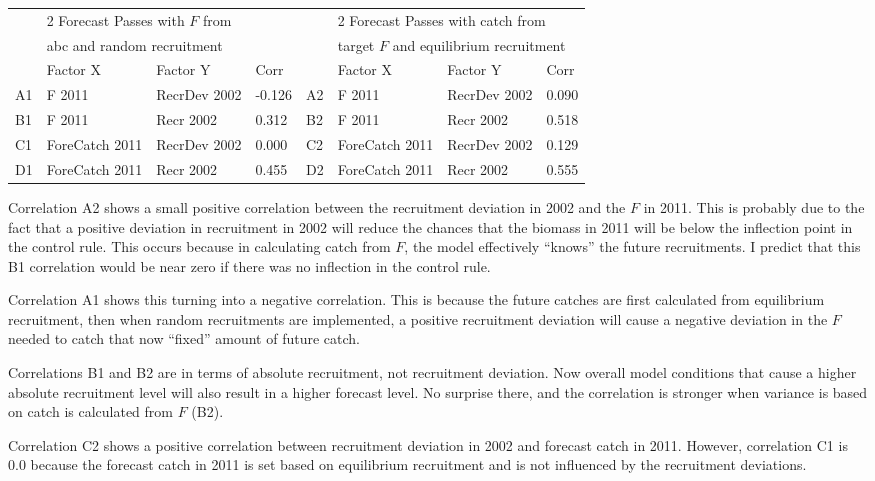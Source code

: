\begin{center}
	\begin{longtable}{p{0.4cm} p{2.75cm} p{3cm} p{1cm} p{0.4cm} p{2.75cm} p{2cm} p{1cm}}
		\hline
		 & \multicolumn{3}{l}{2 Forecast Passes with $F$ from} & & \multicolumn{3}{l}{2 Forecast Passes with catch from} \\
		 & \multicolumn{3}{l}{\gls{abc} and random recruitment} & & \multicolumn{3}{l}{target $F$ and equilibrium recruitment} \\
		\hline
		 & Factor X & Factor Y & Corr & & Factor X & Factor Y & Corr \\
		\hline
		A1 & F 2011 & RecrDev 2002 & -0.126 & A2 & F 2011 & RecrDev 2002 & 0.090 \\
		B1 & F 2011 & Recr 2002 & 0.312 & B2 & F 2011 & Recr 2002 & 0.518 \\
		C1 & ForeCatch 2011 & RecrDev 2002 & 0.000 & C2 & ForeCatch 2011 & RecrDev 2002 & 0.129 \\
		D1 & ForeCatch 2011 & Recr 2002 & 0.455 & D2 & ForeCatch 2011 & Recr 2002 & 0.555 \\
		\hline		
	\end{longtable}
\end{center}

Correlation A2 shows a small positive correlation between the recruitment deviation in 2002 and the $F$ in 2011. This is probably due to the fact that a positive deviation in recruitment in 2002 will reduce the chances that the biomass in 2011 will be below the inflection point in the control rule. This occurs because in calculating catch from $F$, the model effectively ``knows'' the future recruitments. I predict that this B1 correlation would be near zero if there was no inflection in the control rule.

Correlation A1 shows this turning into a negative correlation. This is because the future catches are first calculated from equilibrium recruitment, then when random recruitments are implemented, a positive recruitment deviation will cause a negative deviation in the $F$ needed to catch that now ``fixed'' amount of future catch.

Correlations B1 and B2 are in terms of absolute recruitment, not recruitment deviation. Now overall model conditions that cause a higher absolute recruitment level will also result in a higher forecast level. No surprise there, and the correlation is stronger when variance is based on catch is calculated from $F$ (B2).

Correlation C2 shows a positive correlation between recruitment deviation in 2002 and forecast catch in 2011. However, correlation C1 is 0.0 because the forecast catch in 2011 is set based on equilibrium recruitment and is not influenced by the recruitment deviations.

